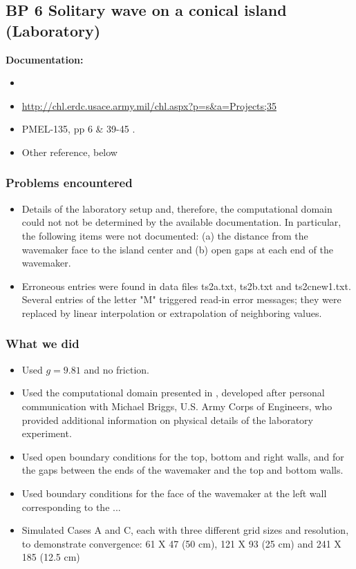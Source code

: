\subsection{BP 6
  Solitary wave on a conical island (Laboratory)}

{\bf Documentation:}
\begin {itemize}

\item \cite{bp-description}
\item \url{http://chl.erdc.usace.army.mil/chl.aspx?p=s&a=Projects;35}
\item PMEL-135, pp 6 \& 39-45 \cite{SynolakisBernard:pmel135}.
\item Other reference, below
\end{itemize} 

\subsubsection {Problems encountered}

\begin {itemize}
\item Details of the laboratory setup and, therefore, the computational domain could not not be determined by the available documentation.  In particular, the following items were not documented: (a) the distance from the wavemaker face to the island center and (b) open gaps at each end of the wavemaker.
\item Erroneous entries were found in data files ts2a.txt, ts2b.txt and ts2cnew1.txt.  Several entries of the letter "M" triggered read-in error messages; they were replaced by linear interpolation or extrapolation of neighboring values.
\end{itemize} 

\subsubsection{What we did}

\begin{itemize}
\item Used $g=9.81$ and no friction.
\item Used the computational domain presented in , developed after personal communication with Michael Briggs, U.S. Army Corps of Engineers, who  provided additional information on physical details of the laboratory experiment.
\item Used open boundary conditions for the top, bottom and right walls, and for the gaps between the ends of the wavemaker and the top and bottom walls.
\item Used boundary conditions for the face of the wavemaker at the left wall corresponding to the ...  
\item Simulated Cases A and C, each with three different grid sizes and resolution, to demonstrate convergence:  61 X 47 (50 cm), 121 X 93 (25 cm) and 241 X 185 (12.5 cm)
\end{itemize}

